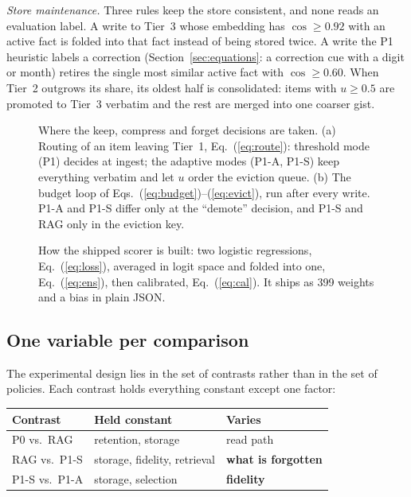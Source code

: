 \emph{Store maintenance.} Three rules keep the store consistent, and none
reads an evaluation label. A write to Tier~3 whose embedding has
$\cos\ge0.92$ with an active fact is folded into that fact instead of being
stored twice. A write the P1 heuristic labels a correction (Section~\ref{sec:equations}:
a correction cue with a digit or month) retires the single most similar active
fact with $\cos\ge0.60$. When Tier~2 outgrows its share, its oldest half is
consolidated: items with $u\ge0.5$ are promoted to Tier~3 verbatim and the
rest are merged into one coarser gist.

\begin{figure}[t]
\centering
\resizebox{0.9\textwidth}{!}{}
\caption{Where the keep, compress and forget decisions are taken. (a) Routing
of an item leaving Tier~1, Eq.~(\ref{eq:route}): threshold mode (P1) decides
at ingest; the adaptive modes (P1-A, P1-S) keep everything verbatim and let
$u$ order the eviction queue. (b) The budget loop of
Eqs.~(\ref{eq:budget})--(\ref{eq:evict}), run after every write. P1-A and
P1-S differ only at the ``demote'' decision, and P1-S and RAG only in the
eviction key.}
\label{fig:routing}
\end{figure}

\begin{figure}[t]
\centering
\resizebox{\colfig}{!}{}
\caption{How the shipped scorer is built: two logistic regressions,
Eq.~(\ref{eq:loss}), averaged in logit space and folded into one,
Eq.~(\ref{eq:ens}), then calibrated, Eq.~(\ref{eq:cal}). It ships as 399
weights and a bias in plain JSON.}
\label{fig:training}
\end{figure}

\subsection{One variable per comparison}
The experimental design lies in the set of contrasts rather than in the set of
policies. Each contrast holds everything constant except one factor:

\begin{center}
\small
\begin{tabular}{@{}lll@{}}
\toprule
Contrast & Held constant & Varies \\
\midrule
P0 vs.\ RAG   & retention, storage & read path \\
RAG vs.\ P1-S & storage, fidelity, retrieval & \textbf{what is forgotten} \\
P1-S vs.\ P1-A& storage, selection & \textbf{fidelity} \\
\bottomrule
\end{tabular}
\end{center}

